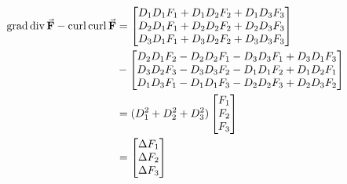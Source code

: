 \documentclass{homework}
\DeclareMathOperator{\grad}{grad}
\DeclareMathOperator{\curl}{curl}
\DeclareMathOperator{\rediv}{div}
\renewcommand\div{\rediv}
\begin{document}
\begin{problem}{9}
  \begin{align*}
    \grad \div \bvec{F} - \curl \curl \bvec{F} &=
    \bmat{
      D_1D_1F_1 + D_1D_2F_2 + D_1D_3F_3 \\
      D_2D_1F_1 + D_2D_2F_2 + D_2D_3F_3 \\
      D_3D_1F_1 + D_3D_2F_2 + D_3D_3F_3
    } \\ &-
    \bmat{
      D_2D_1F_2 - D_2D_2F_1 - D_3D_3F_1 + D_3D_1F_3 \\
      D_3D_2F_3 - D_3D_3F_2 - D_1D_1F_2 + D_1D_2F_1 \\
      D_1D_3F_1 - D_1D_1F_3 - D_2D_2F_3 + D_2D_3F_2
    } \\ &=
    (D_1^2 + D_2^2 + D_3^2)\bmat{F_1 \\ F_2 \\ F_3} \\ &=
    \bmat{\Delta F_1 \\ \Delta F_2 \\ \Delta F_3}
  \end{align*}
\end{problem}
\end{document}
